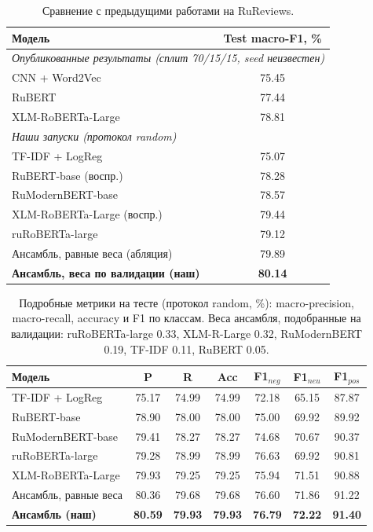 \documentclass{article}
\newcommand{\fTfidf}{75.07}
\newcommand{\fRubert}{78.28}
\newcommand{\fRumodern}{78.57}
\newcommand{\fXlmr}{79.44}
\newcommand{\fRuroberta}{79.12}
\newcommand{\fEns}{80.14}
\newcommand{\fEnsUni}{79.89}
\begin{document}
\begin{table}[!tbh]
\centering
\begin{tabular}{|l|c|}
\hline
\textbf{Модель} & \textbf{Test macro-F1, \%} \\
\hline
\multicolumn{2}{|l|}{\textit{Опубликованные результаты (сплит 70/15/15, seed неизвестен)}} \\
CNN + Word2Vec~\cite{smetanin2019rureviews} & 75.45 \\
RuBERT~\cite{smetanin2021deep} & 77.44 \\
XLM-RoBERTa-Large~\cite{smetanin2022transformers} & 78.81 \\
\hline
\multicolumn{2}{|l|}{\textit{Наши запуски (протокол random)}} \\
TF-IDF + LogReg & \fTfidf \\
RuBERT-base (воспр.) & \fRubert \\
RuModernBERT-base & \fRumodern \\
XLM-RoBERTa-Large (воспр.) & \fXlmr \\
ruRoBERTa-large & \fRuroberta \\
Ансамбль, равные веса (абляция) & \fEnsUni \\
\textbf{Ансамбль, веса по валидации (наш)} & \textbf{\fEns} \\
\hline
\end{tabular}
\caption{Сравнение с предыдущими работами на RuReviews.}
\label{tab:results}
\end{table}


\begin{table}[!tbh]
\centering
\begin{tabular}{|l|ccc|ccc|}
\hline
Модель & P & R & Acc & F1$_{neg}$ & F1$_{neu}$ & F1$_{pos}$ \\
\hline
TF-IDF + LogReg & 75.17 & 74.99 & 74.99 & 72.18 & 65.15 & 87.87 \\
RuBERT-base & 78.90 & 78.00 & 78.00 & 75.00 & 69.92 & 89.92 \\
RuModernBERT-base & 79.41 & 78.27 & 78.27 & 74.68 & 70.67 & 90.37 \\
ruRoBERTa-large & 79.28 & 78.99 & 78.99 & 76.63 & 69.92 & 90.81 \\
XLM-RoBERTa-Large & 79.93 & 79.25 & 79.25 & 75.94 & 71.51 & 90.88 \\
Ансамбль, равные веса & 80.36 & 79.68 & 79.68 & 76.60 & 71.86 & 91.22 \\
\textbf{Ансамбль (наш)} & \textbf{80.59} & \textbf{79.93} & \textbf{79.93} & \textbf{76.79} & \textbf{72.22} & \textbf{91.40} \\
\hline
\end{tabular}
\caption{Подробные метрики на тесте (протокол random, \%): macro-precision, macro-recall, accuracy и F1 по классам. Веса ансамбля, подобранные на валидации: ruRoBERTa-large 0.33, XLM-R-Large 0.32, RuModernBERT 0.19, TF-IDF 0.11, RuBERT 0.05.}
\label{tab:detailed}
\end{table}
\end{document}
